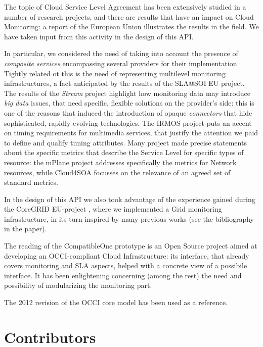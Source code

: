 \documentclass[10pt]{article}  %
\begin{document}
The topic of Cloud Service Level Agreement has been extensively studied in a number of research projects, and there are results that have an impact on Cloud Monitoring: a report \cite{EU-SLA} of the European Union illustrates the results in the field. We have taken input from this activity in the design of this API.

In particular, we considered the need of taking into account the presence of {\em composite services} encompassing several providers for their implementation. Tightly related ot this is the need of representing multilevel monitoring infrastructures, a fact anticipated by the results of the SLA@SOI EU project. The results of the {\em Stream} project highlight how monitoring data may introduce {\em big data} issues, that need specific, flexible solutions on the provider's side: this is one of the reasons that induced the introduction of opaque {\em connectors} that hide sophisticated, rapidly evolving technologies. The IRMOS project puts an accent on timing requirements for multimedia services, that justify the attention we paid to define and qualify timing attributes. Many project made precise statements about the specific metrics that describe the Service Level for specific types of resource: the mPlane project addresses specifically the metrics for Network resources, while Cloud4SOA focusses on the relevance of an agreed set of standard metrics.

In the design of this API we also took advantage of the experience gained during the CoreGRID EU-project \cite{cur:08:a}, where we implemented a Grid monitoring infrastructure, in its turn inspired by many previous works (see the bibliography in the paper).

The reading of the CompatibleOne prototype \cite{mar12a} is an Open Source project aimed at developing an OCCI-compliant Cloud Infrastructure: its interface, that already covers monitoring and SLA aspects, helped with a concrete view of a possibile interface. It has been enlightening concerning (among the rest) the need and possibility of modularizing the monitoring part.

The 2012 revision of the OCCI core model \cite{occi:core} has been used as a reference.





\section{Contributors}
\end{document}
